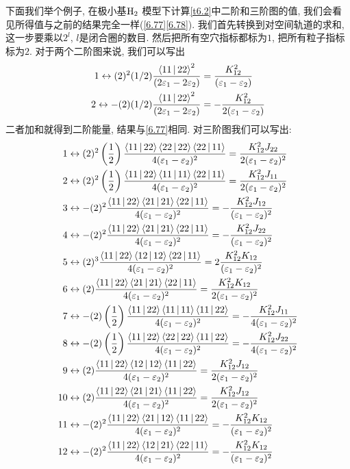 下面我们举个例子, 在极小基$\mathrm{H}_2$ 模型下计算\ref{t6.2}中二阶和三阶图的值, 我们会看见所得值与之前的结果完全一样(\ref{6.77}\ref{6.78}). 我们首先转换到对空间轨道的求和, 这一步要乘以$2^l$, $l$是闭合圈的数目. 然后把所有空穴指标都标为$1$, 把所有粒子指标标为$2$. 对于两个二阶图来说, 我们可以写出
\begin{align*}
1\leftrightarrow (2)^2(1/2)\frac{\Braket{11|22}^2}{(2\varepsilon_1-2\varepsilon_2)} & = \frac{K_{12}^2}{(\varepsilon_1-\varepsilon_2)}\\
2\leftrightarrow -(2)(1/2)\frac{\Braket{11|22}^2}{(2\varepsilon_1-2\varepsilon_2)} & = -\frac{K_{12}^2}{2(\varepsilon_1-\varepsilon_2)}
\end{align*}
二者加和就得到二阶能量, 结果与\ref{6.77}相同. 对三阶图我们可以写出:
\begin{align*}
1&\leftrightarrow (2)^2\left( \frac{1}{2} \right) \frac{\Braket{11|22}\Braket{22|22}\Braket{22|11}}{4(\varepsilon_1 - \varepsilon_2)^2}  = \frac{K_{12}^2J_{22}}{2(\varepsilon_1 - \varepsilon_2)^2}\\
2&\leftrightarrow (2)^2\left( \frac{1}{2} \right) \frac{\Braket{11|22}\Braket{11|11}\Braket{22|11}}{4(\varepsilon_1 - \varepsilon_2)^2}  = \frac{K_{12}^2J_{11}}{2(\varepsilon_1 - \varepsilon_2)^2}\\
3&\leftrightarrow -(2)^2 \frac{\Braket{11|22}\Braket{21|21}\Braket{22|11}}{4(\varepsilon_1 - \varepsilon_2)^2}  = -\frac{K_{12}^2J_{12}}{(\varepsilon_1 - \varepsilon_2)^2}\\
4&\leftrightarrow -(2)^2 \frac{\Braket{11|22}\Braket{21|21}\Braket{22|11}}{4(\varepsilon_1 - \varepsilon_2)^2}  = -\frac{K_{12}^2J_{22}}{(\varepsilon_1 - \varepsilon_2)^2}\\
5&\leftrightarrow (2)^3 \frac{\Braket{11|22}\Braket{12|12}\Braket{22|11}}{4(\varepsilon_1 - \varepsilon_2)^2}  = 2\frac{K_{12}^2K_{12}}{(\varepsilon_1 - \varepsilon_2)^2}\\
6&\leftrightarrow (2) \frac{\Braket{11|22}\Braket{21|21}\Braket{22|11}}{4(\varepsilon_1 - \varepsilon_2)^2}  = \frac{K_{12}^2K_{12}}{2(\varepsilon_1 - \varepsilon_2)^2}\\
7&\leftrightarrow -(2)\left( \frac{1}{2} \right) \frac{\Braket{11|22}\Braket{11|11}\Braket{11|22}}{4(\varepsilon_1 - \varepsilon_2)^2}  = -\frac{K_{12}^2J_{11}}{4(\varepsilon_1 - \varepsilon_2)^2}\\
8&\leftrightarrow -(2)\left( \frac{1}{2} \right) \frac{\Braket{11|22}\Braket{22|22}\Braket{11|22}}{4(\varepsilon_1 - \varepsilon_2)^2}  = -\frac{K_{12}^2J_{22}}{4(\varepsilon_1 - \varepsilon_2)^2}\\
9&\leftrightarrow (2) \frac{\Braket{11|22}\Braket{12|12}\Braket{11|22}}{4(\varepsilon_1 - \varepsilon_2)^2}  = \frac{K_{12}^2J_{12}}{2(\varepsilon_1 - \varepsilon_2)^2}\\
10&\leftrightarrow (2) \frac{\Braket{11|22}\Braket{21|21}\Braket{11|22}}{4(\varepsilon_1 - \varepsilon_2)^2}  = \frac{K_{12}^2J_{12}}{2(\varepsilon_1 - \varepsilon_2)^2}\\
11&\leftrightarrow -(2)^2 \frac{\Braket{11|22}\Braket{21|12}\Braket{11|22}}{4(\varepsilon_1 - \varepsilon_2)^2}  = -\frac{K_{12}^2K_{12}}{(\varepsilon_1 - \varepsilon_2)^2}\\
12&\leftrightarrow -(2)^2 \frac{\Braket{11|22}\Braket{12|21}\Braket{22|11}}{4(\varepsilon_1 - \varepsilon_2)^2}  = -\frac{K_{12}^2K_{12}}{(\varepsilon_1 - \varepsilon_2)^2}
\end{align*}
